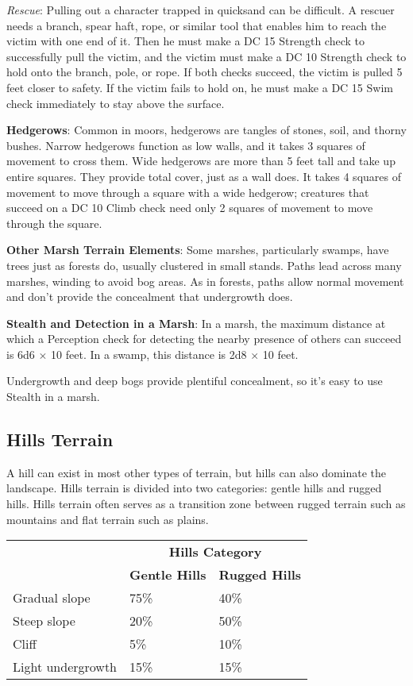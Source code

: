 \textit{Rescue}: Pulling out a character trapped in quicksand can be difficult. A rescuer needs a branch, spear haft, rope, or similar tool that enables him to reach the victim with one end of it. Then he must make a DC 15 Strength check to successfully pull the victim, and the victim must make a DC 10 Strength check to hold onto the branch, pole, or rope. If both checks succeed, the victim is pulled 5 feet closer to safety. If the victim fails to hold on, he must make a DC 15 Swim check immediately to stay above the surface. 
				
\textbf{Hedgerows}: Common in moors, hedgerows are tangles of stones, soil, and thorny bushes. Narrow hedgerows function as low walls, and it takes 3 squares of movement to cross them. Wide hedgerows are more than 5 feet tall and take up entire squares. They provide total cover, just as a wall does. It takes 4 squares of movement to move through a square with a wide hedgerow; creatures that succeed on a DC 10 Climb check need only 2 squares of movement to move through the square.
				
\textbf{Other Marsh Terrain Elements}: Some marshes, particularly swamps, have trees just as forests do, usually clustered in small stands. Paths lead across many marshes, winding to avoid bog areas. As in forests, paths allow normal movement and don't provide the concealment that undergrowth does.
				
\textbf{Stealth and Detection in a Marsh}: In a marsh, the maximum distance at which a Perception check for detecting the nearby presence of others can succeed is 6d6 \mbox{$\times$} 10 feet. In a swamp, this distance is 2d8 \mbox{$\times$} 10 feet.
				
Undergrowth and deep bogs provide plentiful concealment, so it's easy to use Stealth in a marsh.
				
\subsection{Hills Terrain}

				
A hill can exist in most other types of terrain, but hills can also dominate the landscape. Hills terrain is divided into two categories: gentle hills and rugged hills. Hills terrain often serves as a transition zone between rugged terrain such as mountains and flat terrain such as plains.
\begin{tabular}{lll}
 & \multicolumn{2}{c}{\textbf{Hills Category}}\\
 & \textbf{Gentle Hills} & \textbf{Rugged Hills}\\
Gradual slope & 75\% & 40\%\\
Steep slope & 20\% & 50\%\\
Cliff & 5\% & 10\%\\
Light undergrowth & 15\% & 15\%\\
\end{tabular}

